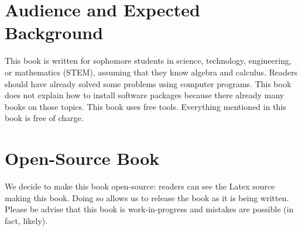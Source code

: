 \section*{Audience and Expected Background}

This book is written for sophomore students in science, technology,
engineering, or mathematics (STEM), assuming that they know algebra
and calculus. Readers should have already solved some problems using
computer programs. This book does not explain how to install software
packages because there already many books on those topics.
This book uses free tools. Everything mentioned in this book is free
of charge.

\section*{Open-Source Book}

We decide to make this book open-source: readers can see the Latex
source making this book.  Doing so allows us to release the book as it
is being written.  Please be advise that this book is work-in-progress
and mistakes are possible (in fact, likely).




